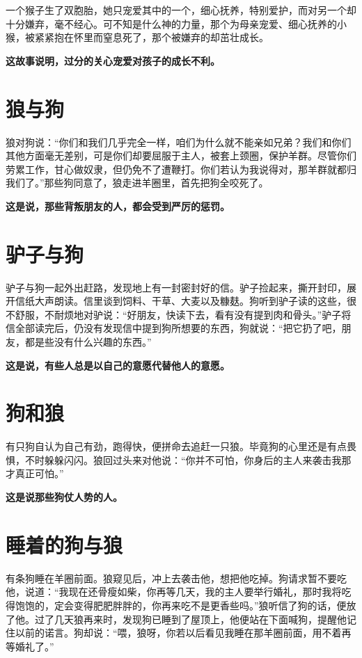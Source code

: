 一个猴子生了双胞胎，她只宠爱其中的一个，细心抚养，特别爱护，而对另一个却十分嫌弃，毫不经心。可不知是什么神的力量，那个为母亲宠爱、细心抚养的小猴，被紧紧抱在怀里而窒息死了，那个被嫌弃的却茁壮成长。

{\bfseries \color{red}这故事说明，过分的关心宠爱对孩子的成长不利。}

\section{狼与狗}

狼对狗说：“你们和我们几乎完全一样，咱们为什么就不能亲如兄弟？我们和你们其他方面毫无差别，可是你们却要屈服于主人，被套上颈圈，保护羊群。尽管你们劳累工作，甘心做奴隶，但仍免不了遭鞭打。你们若认为我说得对，那羊群就都归我们了。”那些狗同意了，狼走进羊圈里，首先把狗全咬死了。

{\bfseries \color{red}这是说，那些背叛朋友的人，都会受到严厉的惩罚。}

\section{驴子与狗}

驴子与狗一起外出赶路，发现地上有一封密封好的信。驴子捡起来，撕开封印，展开信纸大声朗读。信里谈到饲料、干草、大麦以及糠麸。狗听到驴子读的这些，很不舒服，不耐烦地对驴说：“好朋友，快读下去，看有没有提到肉和骨头。”驴子将信全部读完后，仍没有发现信中提到狗所想要的东西，狗就说：“把它扔了吧，朋友，都是些没有什么兴趣的东西。”

{\bfseries \color{red}这是说，有些人总是以自己的意愿代替他人的意愿。}

\section{狗和狼}

有只狗自认为自己有劲，跑得快，便拼命去追赶一只狼。毕竟狗的心里还是有点畏惧，不时躲躲闪闪。狼回过头来对他说：“你并不可怕，你身后的主人来袭击我那才真正可怕。”

{\bfseries \color{red}这是说那些狗仗人势的人。}

\section{睡着的狗与狼}

有条狗睡在羊圈前面。狼窥见后，冲上去袭击他，想把他吃掉。狗请求暂不要吃他，说道：“我现在还骨瘦如柴，你再等几天，我的主人要举行婚礼，那时我将吃得饱饱的，定会变得肥肥胖胖的，你再来吃不是更香些吗。”狼听信了狗的话，便放了他。过了几天狼再来时，发现狗已睡到了屋顶上，他便站在下面喊狗，提醒他记住以前的诺言。狗却说：“喂，狼呀，你若以后看见我睡在那羊圈前面，用不着再等婚礼了。”


